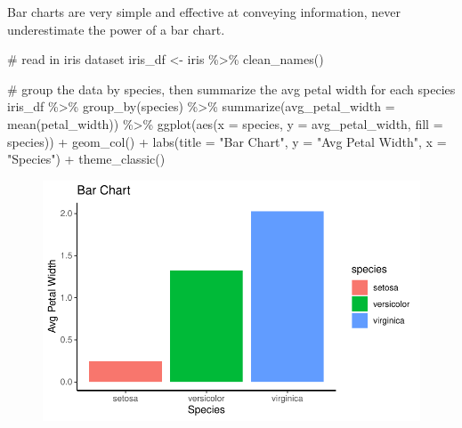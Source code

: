 \documentclass[
  letterpaper,
  DIV=11,
  numbers=noendperiod]{scrreprt}
\newenvironment{Shaded}{\begin{snugshade}}{\end{snugshade}}
\newcommand{\AttributeTok}[1]{\textcolor[rgb]{0.40,0.45,0.13}{#1}}
\newcommand{\CommentTok}[1]{\textcolor[rgb]{0.37,0.37,0.37}{#1}}
\newcommand{\FunctionTok}[1]{\textcolor[rgb]{0.28,0.35,0.67}{#1}}
\newcommand{\NormalTok}[1]{\textcolor[rgb]{0.00,0.23,0.31}{#1}}
\newcommand{\OtherTok}[1]{\textcolor[rgb]{0.00,0.23,0.31}{#1}}
\newcommand{\SpecialCharTok}[1]{\textcolor[rgb]{0.37,0.37,0.37}{#1}}
\newcommand{\StringTok}[1]{\textcolor[rgb]{0.13,0.47,0.30}{#1}}
\begin{document}
Bar charts are very simple and effective at conveying information, never
underestimate the power of a bar chart.

\begin{Shaded}
\begin{Highlighting}[]
\CommentTok{\# read in iris dataset }
\NormalTok{iris\_df }\OtherTok{\textless{}{-}}\NormalTok{ iris }\SpecialCharTok{\%\textgreater{}\%}
  \FunctionTok{clean\_names}\NormalTok{()}

\CommentTok{\# group the data by species, then summarize the avg petal width for each species}
\NormalTok{iris\_df }\SpecialCharTok{\%\textgreater{}\%} 
  \FunctionTok{group\_by}\NormalTok{(species) }\SpecialCharTok{\%\textgreater{}\%}
  \FunctionTok{summarize}\NormalTok{(}\AttributeTok{avg\_petal\_width =} \FunctionTok{mean}\NormalTok{(petal\_width)) }\SpecialCharTok{\%\textgreater{}\%}
  \FunctionTok{ggplot}\NormalTok{(}\FunctionTok{aes}\NormalTok{(}\AttributeTok{x =}\NormalTok{ species, }\AttributeTok{y =}\NormalTok{ avg\_petal\_width, }\AttributeTok{fill =}\NormalTok{ species)) }\SpecialCharTok{+}
  \FunctionTok{geom\_col}\NormalTok{() }\SpecialCharTok{+}
  \FunctionTok{labs}\NormalTok{(}\AttributeTok{title =} \StringTok{"Bar Chart"}\NormalTok{, }\AttributeTok{y =} \StringTok{"Avg Petal Width"}\NormalTok{, }\AttributeTok{x =} \StringTok{"Species"}\NormalTok{) }\SpecialCharTok{+}
  \FunctionTok{theme\_classic}\NormalTok{()}
\end{Highlighting}
\end{Shaded}

\begin{figure}[H]

{\centering \includegraphics{./visualizing-data_files/figure-pdf/unnamed-chunk-8-1.pdf}

}

\end{figure}
\end{document}
